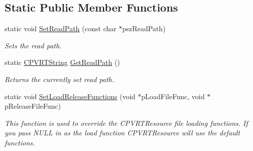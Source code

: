 \subsection*{Static Public Member Functions}
\begin{DoxyCompactItemize}
\item 
static void \hyperlink{class_c_p_v_r_t_resource_file_a0e289bb7f281f32af4497d26753f577c}{Set\+Read\+Path} (const char $\ast$psz\+Read\+Path)
\begin{DoxyCompactList}\small\item\em Sets the read path. \end{DoxyCompactList}\item 
static \hyperlink{class_c_p_v_r_t_string}{C\+P\+V\+R\+T\+String} \hyperlink{class_c_p_v_r_t_resource_file_a9102ac9d97cba5f0e9588349e5b61a95}{Get\+Read\+Path} ()
\begin{DoxyCompactList}\small\item\em Returns the currently set read path. \end{DoxyCompactList}\item 
static void \hyperlink{class_c_p_v_r_t_resource_file_a798c5394174550e8c18e3113c9485fce}{Set\+Load\+Release\+Functions} (void $\ast$p\+Load\+File\+Func, void $\ast$p\+Release\+File\+Func)
\begin{DoxyCompactList}\small\item\em This function is used to override the C\+P\+V\+R\+T\+Resource file loading functions. If you pass N\+U\+L\+L in as the load function C\+P\+V\+R\+T\+Resource will use the default functions. \end{DoxyCompactList}\end{DoxyCompactItemize}
